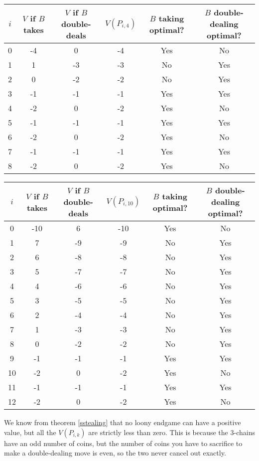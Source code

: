 \documentclass[a4paper,twocolumn]{article}
\begin{document}
\begin{table*}[p]
  \centering
  \begin{tabular}{c c c c c c}
    $i$ & $V$ if $B$ takes & $V$ if $B$ double-deals & $V(P_{i,4})$ & $B$ taking optimal? & $B$ double-dealing optimal? \\
    \hline
    0 & -4 & 0 & -4 & Yes & No \\
    1 & 1 & -3 & -3 & No & Yes \\
    2 & 0 & -2 & -2 & No & Yes \\
    3 & -1 & -1 & -1 & Yes & Yes \\
    4 & -2 & 0 & -2 & Yes & No \\
    5 & -1 & -1 & -1 & Yes & Yes \\
    6 & -2 & 0 & -2 & Yes & No \\
    7 & -1 & -1 & -1 & Yes & Yes \\
    8 & -2 & 0 & -2 & Yes & No
  \end{tabular}
  \caption{$k=4$}
  \label{vpik4}
\end{table*}

\begin{table*}[p]
  \centering
  \begin{tabular}{c c c c c c}
    $i$ & $V$ if $B$ takes & $V$ if $B$ double-deals & $V(P_{i,10})$ & $B$ taking optimal? & $B$ double-dealing optimal? \\
    \hline
    0 & -10 & 6 & -10 & Yes & No \\
    1 & 7 & -9 & -9 & No & Yes \\
    2 & 6 & -8 & -8 & No & Yes \\
    3 & 5 & -7 & -7 & No & Yes \\
    4 & 4 & -6 & -6 & No & Yes \\
    5 & 3 & -5 & -5 & No & Yes \\
    6 & 2 & -4 & -4 & No & Yes \\
    7 & 1 & -3 & -3 & No & Yes \\
    8 & 0 & -2 & -2 & No & Yes \\
    9 & -1 & -1 & -1 & Yes & Yes \\
    10 & -2 & 0 & -2 & Yes & No \\
    11 & -1 & -1 & -1 & Yes & Yes \\
    12 & -2 & 0 & -2 & Yes & No
  \end{tabular}
  \caption{$k=10$}
  \label{vpik10}
\end{table*}

We know from theorem \ref{sstealing} that no loony endgame can have a
positive value, but all the $V(P_{i,k})$ are strictly less than
zero. This is because the 3-chains have an odd number of coins, but
the number of coins you have to sacrifice to make a double-dealing
move is even, so the two never cancel out exactly.
\end{document}

